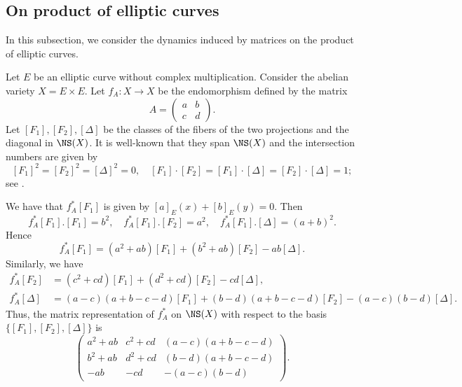 \subsection{On product of elliptic curves}


    In this subsection, we consider the dynamics induced by matrices on the product of elliptic curves.

    Let \(E\) be an elliptic curve without complex multiplication.
    Consider the abelian variety \(X = E \times E\).
    Let \(f_A: X \to X\) be the endomorphism defined by the matrix
    \[ A = \begin{pmatrix}
        a & b \\
        c & d
    \end{pmatrix}. \]
    Let \([F_1], [F_2], [\Delta]\) be the classes of the fibers of the two projections and the diagonal in \(\NS(X)\).
    It is well-known that they span \(\NS(X)\) and the intersection numbers are given by
    \[ [F_1]^2 = [F_2]^2 = [\Delta]^2 = 0, \quad [F_1] \cdot [F_2] = [F_1] \cdot [\Delta] = [F_2] \cdot [\Delta] = 1; \]
    see \cite[Section 1.5.B]{Laz04a}.

    We have that \(f_A^*[F_1]\) is given by \([a]_E (x) + [b]_E (y) = 0\).
    Then
    \[ f_A^*[F_1].[F_1] = b^2, \quad f_A^*[F_1].[F_2] = a^2, \quad f_A^*[F_1].[\Delta] = (a+b)^2. \]
    Hence
    \[ f_A^*[F_1] = (a^2+ab) [F_1] + (b^2+ab) [F_2] - ab [\Delta]. \]
    Similarly, we have
    \begin{align*}
        f_A^*[F_2] &= (c^2+cd) [F_1] + (d^2+cd) [F_2] - cd [\Delta], \\
        f_A^*[\Delta] &= (a-c)(a+b-c-d) [F_1] + (b-d)(a+b-c-d) [F_2] - (a-c)(b-d) [\Delta].
    \end{align*}
    Thus, the matrix representation of \(f_A^*\) on \(\NS(X)\) with respect to the basis \(\{[F_1], [F_2], [\Delta]\}\) is
    \[
        \begin{pmatrix}
            a^2+ab & c^2+cd & (a-c)(a+b-c-d) \\
            b^2+ab & d^2+cd & (b-d)(a+b-c-d) \\
            -ab & -cd & -(a-c)(b-d)
        \end{pmatrix}.
    \]

